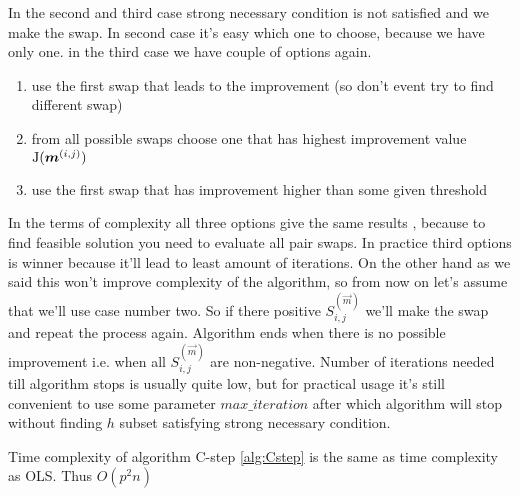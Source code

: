 In the second and third case strong necessary condition is not satisfied and we make the swap. In second case it's easy which one to choose, because we have only one. in the third case we have couple of options again. 
\begin{enumerate}
	\item use the first swap that leads to the improvement (so don't event try to find different swap)
	\item from all possible swaps choose one that has highest improvement value  $\operatorname{J}(\boldsymbol{m}^{(i,j)})$
	\item use the first swap that has improvement higher than some given threshold
\end{enumerate}
In the terms of complexity all three options give the same results , because to find feasible solution you need to evaluate all pair swaps. In practice third options is winner because it'll lead to least amount of iterations. On the other hand as we said this won't improve complexity of the algorithm, so from now on let's assume that we'll use case number two.
So if there positive  $S^{(\vec{m})}_{i,j}$ we'll make the swap and repeat the process again. 
Algorithm ends when there is no possible improvement i.e. when all $S^{(\vec{m})}_{i,j}$ are non-negative.
Number of iterations needed till algorithm stops is usually quite low, but for practical usage it's still convenient to use some parameter $max\_iteration$ after which algorithm will stop without finding $h$ subset satisfying strong necessary condition. 


\begin{observation} 
	Time complexity of algorithm C-step \ref{alg:Cstep} is the same as time complexity as OLS. Thus $O(p^2n)$
\end{observation} 


